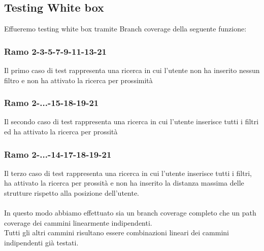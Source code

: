 \pagebreak
\subsection{Testing White box}
Effueremo testing white box tramite Branch coverage della seguente funzione:







\subsubsection{Ramo 2-3-5-7-9-11-13-21}
Il primo caso di test rappresenta una ricerca in cui l'utente non ha inserito nessun filtro e non ha attivato la ricerca per prossimità

\subsubsection{Ramo 2-...-15-18-19-21}
Il secondo caso di test rappresenta una ricerca in cui l'utente inserisce tutti i filtri ed ha attivato la ricerca per prossità

\subsubsection{Ramo 2-...-14-17-18-19-21}
Il terzo caso di test rappresenta una ricerca in cui l'utente inserisce tutti i filtri, ha attivato la ricerca per prossità e non ha inserito la distanza massima delle strutture rispetto alla posizione dell'utente.\\
\\
In questo modo abbiamo effettuato sia un branch coverage completo che un path coverage dei cammini linearmente indipendenti.\\ Tutti gli altri cammini risultano essere combinazioni lineari
dei cammini indipendenti già testati. 